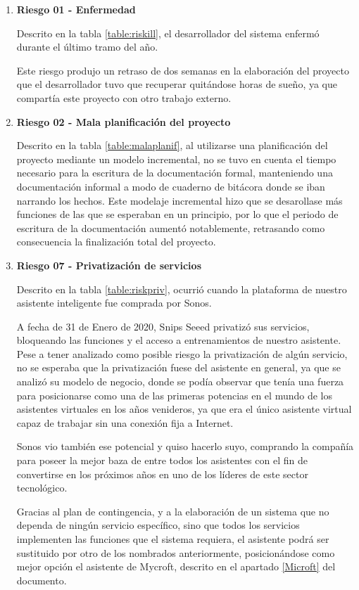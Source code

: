         \begin{enumerate}
        
        \item \textbf{Riesgo 01 - Enfermedad}
        
        Descrito en la tabla \ref{table:riskill}, el desarrollador del sistema enfermó durante el último tramo del año.
        
        Este riesgo produjo un retraso de dos semanas en la elaboración del proyecto que el desarrollador tuvo que recuperar quitándose horas de sueño, ya que compartía este proyecto con otro trabajo externo.
        
        \item \textbf{Riesgo 02 - Mala planificación del proyecto}
        
        Descrito en la tabla \ref{table:malaplanif}, al utilizarse una planificación del proyecto mediante un modelo incremental, no se tuvo en cuenta el tiempo necesario para la escritura de la documentación formal, manteniendo una documentación informal a modo de cuaderno de bitácora donde se iban narrando los hechos.
        Este modelaje incremental hizo que se desarollase más funciones de las que se esperaban en un principio, por lo que el periodo de escritura de la documentación aumentó notablemente, retrasando como consecuencia la finalización total del proyecto.
        
            \item \textbf{Riesgo 07 - Privatización de servicios}
            
        Descrito en la tabla \ref{table:riskpriv}, ocurrió cuando la plataforma de nuestro asistente inteligente fue comprada por Sonos. 
        
        A fecha de 31 de Enero de 2020, Snips Seeed privatizó sus servicios, bloqueando las funciones y el acceso a entrenamientos de nuestro asistente. Pese a tener analizado como posible riesgo la privatización de algún servicio, no se esperaba que la privatización fuese del asistente en general, ya que se analizó su modelo de negocio, donde se podía observar que tenía una fuerza para posicionarse como una de las primeras potencias en el mundo de los asistentes virtuales en los años venideros, ya que era el único asistente virtual capaz de trabajar sin una conexión fija a Internet. 
        
        Sonos vio también ese potencial y quiso hacerlo suyo, comprando la compañía para poseer la mejor baza de entre todos los asistentes con el fin de convertirse en los próximos años en uno de los líderes de este sector tecnológico.
        
        Gracias al plan de contingencia, y a la elaboración de un sistema que no dependa de ningún servicio específico, sino que todos los servicios implementen las funciones que el sistema requiera, el asistente podrá ser sustituido por otro de los nombrados anteriormente, posicionándose como mejor opción el asistente de Mycroft, descrito en el apartado \ref{Microft} del documento.
        
        
        \end{enumerate}